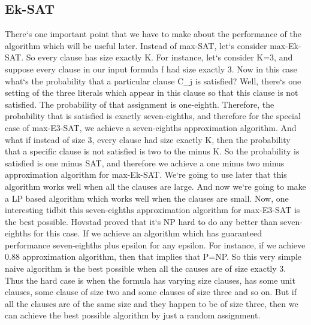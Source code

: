 \subsection{Ek-SAT}
There`s one important point that we have to make about the performance of the algorithm which will be useful later.
Instead of max-SAT, let`s consider max-Ek-SAT\@.
So every clause has size exactly K\@.
For instance, let`s consider K=3, and suppose every clause in our input formula f had size exactly 3.
Now in this case what`s the probability that a particular clause C\_j is satisfied? Well, there`s one setting of the three literals which appear in this clause so that this clause is not satisfied.
The probability of that assignment is one-eighth.
Therefore, the probability that is satisfied is exactly seven-eighths, and therefore for the special case of max-E3-SAT, we achieve a seven-eighths approximation algorithm.
And what if instead of size 3, every clause had size exactly K, then the probability that a specific clause is not satisfied is two to the minus K\@.
So the probability is satisfied is one minus SAT, and therefore we achieve a one minus two minus approximation algorithm for max-Ek-SAT\@.
We`re going to use later that this algorithm works well when all the clauses are large.
And now we`re going to make a LP based algorithm which works well when the clauses are small.
Now, one interesting tidbit this seven-eighths approximation algorithm for max-E3-SAT is the best possible.
Hovstad proved that it`s NP hard to do any better than seven-eighths for this case.
If we achieve an algorithm which has guaranteed performance seven-eighths plus epsilon for any epsilon.
For instance, if we achieve 0.88 approximation algorithm, then that implies that P=NP\@.
So this very simple naive algorithm is the best possible when all the causes are of size exactly 3.
Thus the hard case is when the formula has varying size clauses, has some unit clauses, some clause of size two and some clauses of size three and so on.
But if all the clauses are of the same size and they happen to be of size three, then we can achieve the best possible algorithm by just a random assignment.

